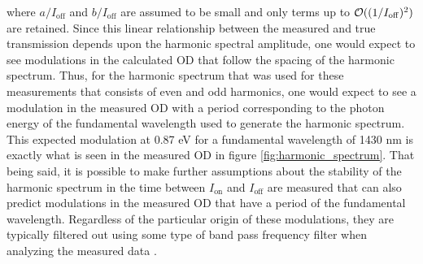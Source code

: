 where $a/I_{\mathrm{off}}$ and $b/I_{\mathrm{off}}$ are assumed to be small and only terms up to $\mathcal{O}((1/I_{\mathrm{off}})^2)$ are retained.  Since this linear relationship between the measured and true transmission depends upon the harmonic spectral amplitude, one would expect to see modulations in the calculated OD that follow the spacing of the harmonic spectrum.  Thus, for the harmonic spectrum that was used for these measurements that consists of even and odd harmonics, one would expect to see a modulation in the measured OD with a period corresponding to the photon energy of the fundamental wavelength used to generate the harmonic spectrum. This expected modulation at 0.87 eV for a fundamental wavelength of 1430 nm is exactly what is seen in the measured OD in figure \ref{fig:harmonic_spectrum}.  That being said, it is possible to make further assumptions about the stability of the harmonic spectrum in the time between $I_{\mathrm{on}}$ and $I_{\mathrm{off}}$ are measured that can also predict modulations in the measured OD that have a period of the fundamental wavelength.  Regardless of the particular origin of these modulations, they are typically filtered out using some type of band pass frequency filter when analyzing the measured data \cite{ottAttosecondMultidimensionalInterferometry2012, husekElucidatingSurfaceCharge2019}.

